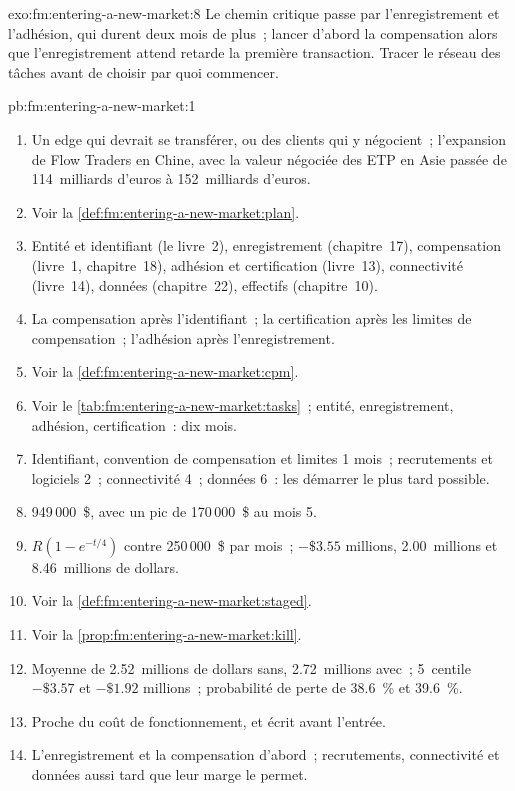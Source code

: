 \begin{solution}{exo:fm:entering-a-new-market:8}
Le chemin critique passe par l'enregistrement et l'adhésion, qui durent deux mois de plus~; lancer d'abord la compensation alors que l'enregistrement attend retarde
la première transaction. Tracer le réseau des tâches avant de choisir par quoi commencer.
\end{solution}

\begin{solution}{pb:fm:entering-a-new-market:1}
\begin{enumerate}
\item Un edge qui devrait se transférer, ou des clients qui y négocient~; l'expansion de Flow Traders en Chine, avec la valeur négociée des ETP en Asie passée de
114~milliards d'euros à 152~milliards d'euros.
\item Voir la \cref{def:fm:entering-a-new-market:plan}.
\item Entité et identifiant (le livre~2), enregistrement (chapitre~17), compensation (livre~1, chapitre~18), adhésion et certification (livre~13),
connectivité (livre~14), données (chapitre~22), effectifs (chapitre~10).
\item La compensation après l'identifiant~; la certification après les limites de compensation~; l'adhésion après l'enregistrement.
\item Voir la \cref{def:fm:entering-a-new-market:cpm}.
\item Voir le \cref{tab:fm:entering-a-new-market:tasks}~; entité, enregistrement, adhésion, certification~: dix mois.
\item Identifiant, convention de compensation et limites 1 mois~; recrutements et logiciels 2~; connectivité 4~; données 6~: les démarrer le plus tard possible.
\item 949\,000~\$, avec un pic de 170\,000~\$ au mois 5.
\item $R(1-e^{-t/4})$ contre 250\,000~\$ par mois~; $-\$3.55$ millions, 2.00~millions et 8.46~millions de dollars.
\item Voir la \cref{def:fm:entering-a-new-market:staged}.
\item Voir la \cref{prop:fm:entering-a-new-market:kill}.
\item Moyenne de 2.52~millions de dollars sans, 2.72~millions avec~; 5~centile $-\$3.57$ et $-\$1.92$ millions~; probabilité de perte de 38.6~\% et 39.6~\%.
\item Proche du coût de fonctionnement, et écrit avant l'entrée.
\item L'enregistrement et la compensation d'abord~; recrutements, connectivité et données aussi tard que leur marge le permet.

\end{enumerate}
\end{solution}
